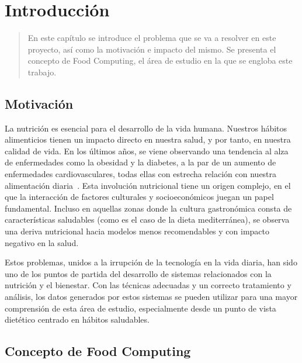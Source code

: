 \chapter{Introducción}
\label{ch:introduccion}

\begin{quote}
  En este capítulo se introduce el problema que se va a resolver en este proyecto, así como la motivación e impacto del mismo. Se presenta el concepto de Food Computing, el área de estudio en la que se engloba este trabajo. 
\end{quote}


\section{Motivación}
 
La nutrición es esencial para el desarrollo de la vida humana. Nuestros hábitos alimenticios tienen un impacto directo en nuestra salud, y por tanto, en nuestra calidad de vida. En los últimos años, se viene observando una tendencia al alza de enfermedades como la obesidad y la diabetes, a la par de un aumento de enfermedades cardiovasculares, todas ellas con estrecha relación con nuestra alimentación diaria~\cite{d2019obesity}. Esta involución nutricional tiene un origen complejo, en el que la interacción de factores culturales y socioeconómicos juegan un papel fundamental. Incluso en aquellas zonas donde la cultura gastronómica consta de características saludables (como es el caso de la dieta mediterránea), se observa una deriva nutricional hacia modelos menos recomendables y con impacto negativo en la salud. 

Estos problemas, unidos a la irrupción de la tecnología en la vida diaria, han sido uno de los puntos de partida del desarrollo de sistemas relacionados con la nutrición y el bienestar. 
Con las técnicas adecuadas y un correcto tratamiento y análisis, los datos generados por estos  sistemas se pueden utilizar para una mayor comprensión de esta área de estudio, especialmente desde un punto de vista dietético centrado en hábitos saludables.


\section{Concepto de Food Computing}

